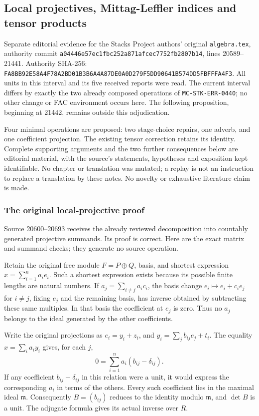 \subsection{Local projectives, Mittag-Leffler indices and tensor products}\label{local-projectives-mittag-leffler-indices-and-tensor-products}

Separate editorial evidence for the Stacks Project authors' original \texttt{algebra.tex}, authority commit \texttt{a04446e57ec1fbc252a871afcec7752fb2807b14}, lines 20589--21441. Authority SHA-256: \texttt{FA8BB92E58A4F78A2BD01B3B6A4A87DE0A0D279F5DD90641B574DD5FBFFFA4F3}. All units in this interval and its five received reports were read. The current interval differs by exactly the two already composed operations of \texttt{MC-STK-ERR-0440}; no other change or FAC environment occurs here. The following proposition, beginning at 21442, remains outside this adjudication.

Four minimal operations are proposed: two stage-choice repairs, one adverb, and one coefficient projection. The existing tensor correction retains its identity. Complete supporting arguments and the two further consequences below are editorial material, with the source's statements, hypotheses and exposition kept identifiable. No chapter or translation was mutated; a replay is not an instruction to replace a translation by these notes. No novelty or exhaustive literature claim is made.

\subsubsection{The original local-projective proof}\label{the-original-local-projective-proof}

Source 20600--20693 receives the already reviewed decomposition into countably generated projective summands. Its proof is correct. Here are the exact matrix and summand checks; they generate no source operation.

Retain the original free module \(F=P\oplus Q\), basis, and shortest expression \(x=\sum_{i=1}^n a_i e_i\). Such a shortest expression exists because its possible finite lengths are natural numbers. If \(a_j=\sum_{i\ne j}a_i c_i\), the basis change \(e_i\mapsto e_i+c_i e_j\) for \(i\ne j\), fixing \(e_j\) and the remaining basis, has inverse obtained by subtracting these same multiples. In that basis the coefficient at \(e_j\) is zero. Thus no \(a_j\) belongs to the ideal generated by the other coefficients.

Write the original projections as \(e_i=y_i+z_i\), and \(y_i=\sum_j b_{ij}e_j+t_i\). The equality \(x=\sum_i a_i y_i\) gives, for each \(j\), \[
0=\sum_{i=1}^n a_i(b_{ij}-\delta_{ij}).
\] If any coefficient \(b_{ij}-\delta_{ij}\) in this relation were a unit, it would express the corresponding \(a_i\) in terms of the others. Every such coefficient lies in the maximal ideal \(\mathfrak m\). Consequently \(B=(b_{ij})\) reduces to the identity modulo \(\mathfrak m\), and \(\det B\) is a unit. The adjugate formula gives its actual inverse over \(R\).

